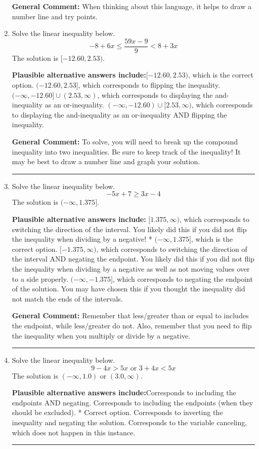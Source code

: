 \documentclass{extbook}[14pt]
\newcommand{\litem}[1]{\item #1

\rule{\textwidth}{0.4pt}}
\begin{document}
\begin{enumerate}
{\textbf{General Comment:} When thinking about this language, it helps to draw a number line and try points.
}
\litem{
Solve the linear inequality below.
\[ -8 + 6 x \leq \frac{59 x - 9}{9} < 8 + 3 x \]The solution is \( [-12.60, 2.53) \).\begin{enumerate}[label=\Alph*.]
\textbf{Plausible alternative answers include:}$[-12.60, 2.53)$, which is the correct option.
$(-12.60, 2.53]$, which corresponds to flipping the inequality.
$(-\infty, -12.60] \cup (2.53, \infty)$, which corresponds to displaying the and-inequality as an or-inequality.
$(-\infty, -12.60) \cup [2.53, \infty)$, which corresponds to displaying the and-inequality as an or-inequality AND flipping the inequality.

\end{enumerate}

\textbf{General Comment:} To solve, you will need to break up the compound inequality into two inequalities. Be sure to keep track of the inequality! It may be best to draw a number line and graph your solution.
}
\litem{
Solve the linear inequality below.
\[ -5x + 7 \geq 3x -4 \]The solution is \( (-\infty, 1.375] \).\begin{enumerate}[label=\Alph*.]
\textbf{Plausible alternative answers include:} $[1.375, \infty)$, which corresponds to switching the direction of the interval. You likely did this if you did not flip the inequality when dividing by a negative!
* $(-\infty, 1.375]$, which is the correct option.
 $[-1.375, \infty)$, which corresponds to switching the direction of the interval AND negating the endpoint. You likely did this if you did not flip the inequality when dividing by a negative as well as not moving values over to a side properly.
 $(-\infty, -1.375]$, which corresponds to negating the endpoint of the solution.
You may have chosen this if you thought the inequality did not match the ends of the intervals.
\end{enumerate}

\textbf{General Comment:} Remember that less/greater than or equal to includes the endpoint, while less/greater do not. Also, remember that you need to flip the inequality when you multiply or divide by a negative.
}
\litem{
Solve the linear inequality below.
\[ 9 - 4 x > 5 x \text{ or } 3 + 4 x < 5 x \]The solution is \( (-\infty, 1.0) \text{ or } (3.0, \infty) \).\begin{enumerate}[label=\Alph*.]
\textbf{Plausible alternative answers include:}Corresponds to including the endpoints AND negating.
Corresponds to including the endpoints (when they should be excluded).
 * Correct option.
Corresponds to inverting the inequality and negating the solution.
Corresponds to the variable canceling, which does not happen in this instance.
\end{enumerate}

}
\end{enumerate}
\end{document}
